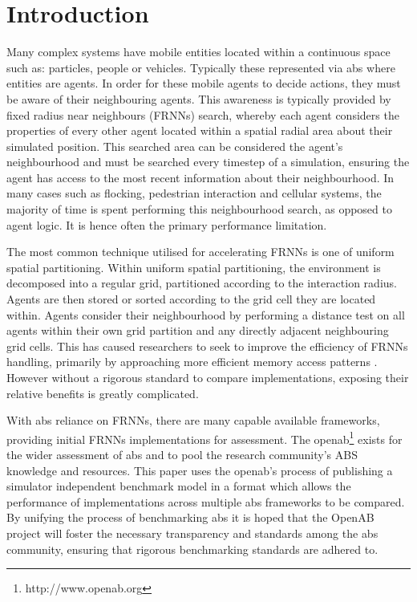 \section{Introduction}
\vspace{-0.3cm}
Many complex systems have mobile entities located within a continuous space such as: particles, people or vehicles. Typically these represented via \gls{abs} where entities are agents. In order for these mobile agents to decide actions, they must be aware of their neighbouring agents. This awareness is typically provided by fixed radius near neighbours (FRNNs) search, whereby each agent considers the properties of every other agent located within a spatial radial area about their simulated position. This searched area can be considered the agent's neighbourhood and must be searched every timestep of a simulation, ensuring the agent has access to the most recent information about their neighbourhood. In many cases such as flocking, pedestrian interaction and cellular systems, the majority of time is spent performing this neighbourhood search, as opposed to agent logic. It is hence often the primary performance limitation.
  
  The most common technique utilised for accelerating FRNNs is one of uniform spatial partitioning. Within uniform spatial partitioning, the environment is decomposed into a regular grid, partitioned according to the interaction radius. Agents are then stored or sorted according to the grid cell they are located within. Agents consider their neighbourhood by performing a distance test on all agents within their own grid partition and any directly adjacent neighbouring grid cells. This has caused researchers to seek to improve the efficiency of FRNNs handling, primarily by approaching more efficient memory access patterns \cite{GS*10,Hoe14,HY*15}. However without a rigorous standard to compare implementations, exposing their relative benefits is greatly complicated.
  
  With \gls{abs} reliance on FRNNs, there are many capable available frameworks, providing initial FRNNs implementations for assessment. The \gls{openab}\footnote{http://www.openab.org} exists for the wider assessment of \gls{abs} and to pool the research community's ABS knowledge and resources. This paper uses the \gls{openab}'s process of publishing a simulator independent benchmark model in a format which allows the performance of implementations across multiple \gls{abs} frameworks to be compared. By unifying the process of benchmarking \gls{abs} it is hoped that the OpenAB project will foster the necessary transparency and standards among the \gls{abs} community, ensuring that rigorous benchmarking standards are adhered to.
  

